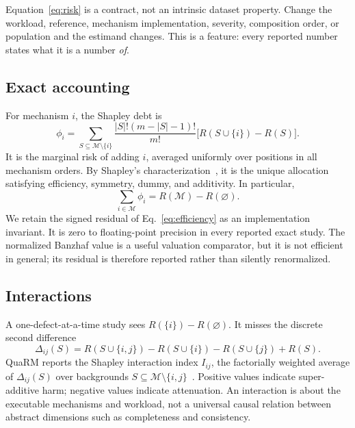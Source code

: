 \documentclass[conference]{IEEEtran}
\newcommand{\method}{QuaRM}
\newcommand{\players}{\mathcal{M}}
\begin{document}
Equation~\ref{eq:risk} is a contract, not an intrinsic dataset property. Change the workload, reference, mechanism implementation, severity, composition order, or population and the estimand changes. This is a feature: every reported number states what it is a number \emph{of}.

\subsection{Exact accounting}

For mechanism $i$, the Shapley debt is
\begin{equation}
 \phi_i=\sum_{S\subseteq\players\setminus\{i\}}
 \frac{|S|!(m-|S|-1)!}{m!}\big[R(S\cup\{i\})-R(S)\big].
 \label{eq:shapley}
\end{equation}
It is the marginal risk of adding $i$, averaged uniformly over positions in all mechanism orders. By Shapley's characterization~\cite{shapley1953value}, it is the unique allocation satisfying efficiency, symmetry, dummy, and additivity. In particular,
\begin{equation}
 \sum_{i\in\players}\phi_i=R(\players)-R(\varnothing).
 \label{eq:efficiency}
\end{equation}
We retain the signed residual of Eq.~\ref{eq:efficiency} as an implementation invariant. It is zero to floating-point precision in every reported exact study. The normalized Banzhaf value is a useful valuation comparator, but it is not efficient in general; its residual is therefore reported rather than silently renormalized.

\subsection{Interactions}

A one-defect-at-a-time study sees $R(\{i\})-R(\varnothing)$. It misses the discrete second difference
\begin{equation}
 \Delta_{ij}(S)=R(S\cup\{i,j\})-R(S\cup\{i\})-R(S\cup\{j\})+R(S).
\end{equation}
\method{} reports the Shapley interaction index $I_{ij}$, the factorially weighted average of $\Delta_{ij}(S)$ over backgrounds $S\subseteq\players\setminus\{i,j\}$~\cite{grabisch1999interaction}. Positive values indicate super-additive harm; negative values indicate attenuation. An interaction is about the executable mechanisms and workload, not a universal causal relation between abstract dimensions such as completeness and consistency.
\end{document}
